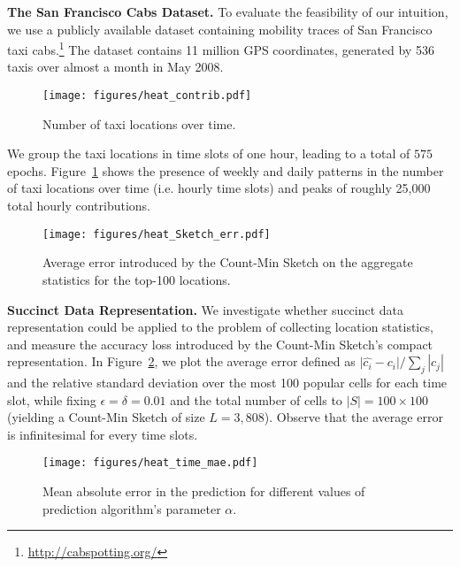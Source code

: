\documentclass[conference]{IEEEtran}
\newcommand{\descr}[1]{\medskip \noindent \textbf{#1}}
\begin{document}
\descr{The San Francisco Cabs Dataset.}
To evaluate the feasibility of our intuition, we use a publicly available dataset containing mobility traces of San Francisco taxi cabs.\footnote{\url{http://cabspotting.org/}}
The dataset contains  11 million GPS coordinates, generated by 536 taxis over almost a month in May 2008. 
\begin{figure}[t]
\centering
\texttt{[image: figures/heat\_contrib.pdf]}
\vspace{-0.15cm}
\caption{\label{fig:heat-slots} Number of taxi locations over time.}
\vspace{-0.2cm}
\end{figure}
We group the taxi locations in time slots of one hour, leading to a total of $575$ epochs.
Figure~\ref{fig:heat-slots} shows 
the presence of weekly and daily patterns in the number of taxi locations over time (i.e. hourly time slots) and peaks of roughly 25,000 total hourly contributions.
\begin{figure}[t]
\centering
\texttt{[image: figures/heat\_Sketch\_err.pdf]}
\vspace{-0.1cm}
\caption{\label{fig:heat-error} Average error introduced by the Count-Min Sketch on the aggregate statistics for the top-100 locations.}
\vspace{-0.25cm}
\end{figure}

\descr{Succinct Data Representation.} We investigate whether succinct data representation could be applied to the problem of collecting location statistics, and measure the accuracy loss introduced by the Count-Min Sketch's compact representation. In Figure~\ref{fig:heat-error}, we plot the average error defined as
$\vert \hat{c_i} - c_i \vert/\sum_{j} |c_j|$
and the relative standard deviation over the most 100 popular cells for each time slot, while fixing $\epsilon = \delta = 0.01$ 
and the total number of cells to $|S| = 100 \times 100$ (yielding a Count-Min Sketch of size $L = 3,808$).
Observe that the average error is infinitesimal for every time slots.

\begin{figure}[t]
\centering
\texttt{[image: figures/heat\_time\_mae.pdf]}
\vspace{-0.1cm}
\caption{\label{fig:heat-pred} Mean absolute error in the prediction for different values of prediction algorithm's parameter $\alpha$.}
\vspace{-0.15cm}
\end{figure}
\end{document}
